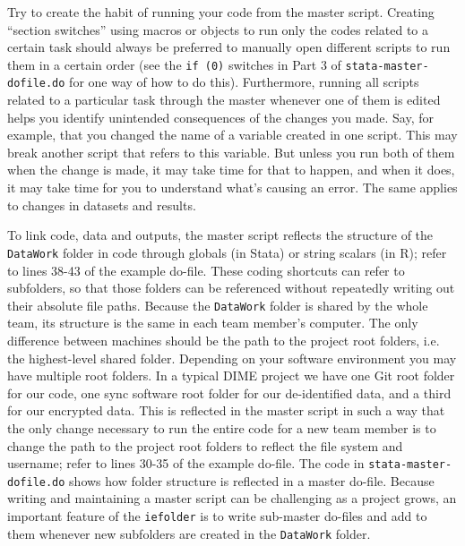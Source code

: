 Try to create the habit of running your code from the master script.
Creating ``section switches'' using macros or objects to run only the codes related to a certain task
should always be preferred to manually open different scripts to run them in a certain order
(see the \texttt{if (0)} switches in Part 3 of \texttt{stata-master-dofile.do} for one way of how to do this).
Furthermore, running all scripts related to a particular task through the master whenever one of them is edited
helps you identify unintended consequences of the changes you made.
Say, for example, that you changed the name of a variable created in one script.
This may break another script that refers to this variable.
But unless you run both of them when the change is made, it may take time for that to happen,
and when it does, it may take time for you to understand what's causing an error.
The same applies to changes in datasets and results.

To link code, data and outputs,
the master script reflects the structure of the \texttt{DataWork} folder in code
through globals (in Stata) or string scalars (in R);
refer to lines 38-43 of the example do-file.
These coding shortcuts can refer to subfolders,
so that those folders can be referenced without repeatedly writing out their absolute file paths.
Because the \texttt{DataWork} folder is shared by the whole team,
its structure is the same in each team member's computer.
The only difference between machines should be
the path to the project root folders, i.e. the highest-level shared folder.
Depending on your software environment you may have multiple root folders.
In a typical DIME project we have one Git root folder for our code,
one sync software root folder for our de-identified data,
and a third for our encrypted data.
This is reflected in the master script in such a way that
the only change necessary to run the entire code for a new team member
is to change the path to the project root folders
to reflect the file system and username;
refer to lines 30-35 of the example do-file.
The code in \texttt{stata-master-dofile.do} shows how folder structure is reflected in a master do-file.
Because writing and maintaining a master script can be challenging as a project grows,
an important feature of the \texttt{iefolder} is to write sub-master do-files
and add to them whenever new subfolders are created in the \texttt{DataWork} folder.

